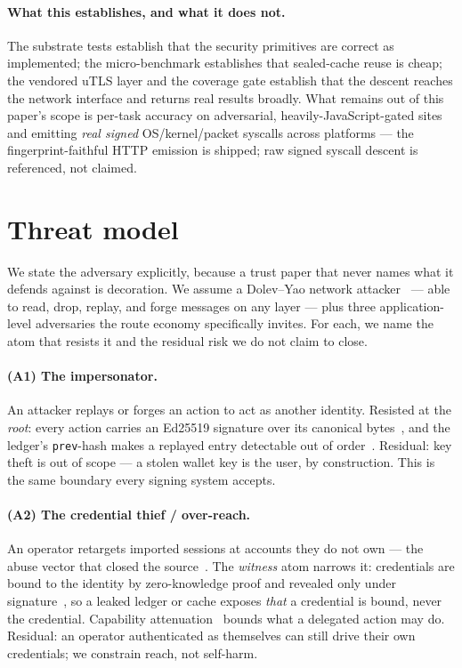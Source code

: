 \documentclass[11pt]{article}
\begin{document}
\paragraph{What this establishes, and what it does not.} The substrate tests
establish that the security primitives are correct as implemented; the
micro-benchmark establishes that sealed-cache reuse is cheap; the vendored uTLS layer
and the coverage gate establish that the descent reaches the network interface and
returns real results broadly. What remains out of this paper's scope is per-task
accuracy on adversarial, heavily-JavaScript-gated sites and emitting \emph{real
signed} OS/kernel/packet syscalls across platforms --- the fingerprint-faithful HTTP
emission is shipped; raw signed syscall descent is referenced, not claimed.
\section{Threat model}

We state the adversary explicitly, because a trust paper that never names what it
defends against is decoration. We assume a Dolev--Yao network
attacker~\cite{dolevyao} --- able to read, drop, replay, and forge messages on any
layer --- plus three application-level adversaries the route economy specifically
invites. For each, we name the atom that resists it and the residual risk we do not
claim to close.

\paragraph{(A1) The impersonator.} An attacker replays or forges an action to act
as another identity. Resisted at the \emph{root}: every action carries an Ed25519
signature over its canonical bytes~\cite{rfc8032}, and the ledger's
\texttt{prev}-hash makes a replayed entry detectable out of order~\cite{rfc6962}.
Residual: key theft is out of scope --- a stolen wallet key is the user, by
construction. This is the same boundary every signing system accepts.

\paragraph{(A2) The credential thief / over-reach.} An operator retargets imported
sessions at accounts they do not own --- the abuse vector that closed the
source~\cite{ossnotice}. The \emph{witness} atom narrows it: credentials are bound
to the identity by zero-knowledge proof and revealed only under
signature~\cite{zklogin,camlys}, so a leaked ledger or cache exposes \emph{that} a
credential is bound, never the credential. Capability attenuation~\cite{ocap} bounds
what a delegated action may do. Residual: an operator authenticated as themselves
can still drive their own credentials; we constrain reach, not self-harm.
\end{document}
